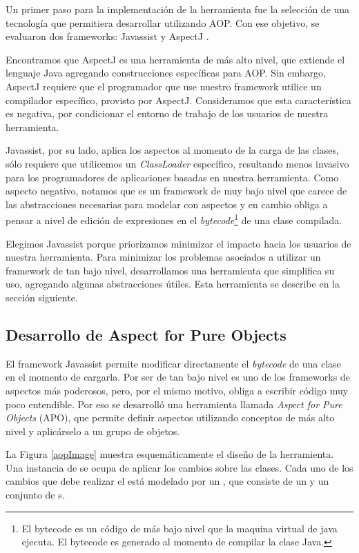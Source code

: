 Un primer paso para la implementación de la herramienta fue la selección de una
tecnología que permitiera desarrollar utilizando AOP.
Con ese objetivo, se evaluaron dos frameworks: Javassist y AspectJ \cite{KiczalesHHKPG01}.

\medskip 
Encontramos que AspectJ es una herramienta de más alto nivel, que extiende
el lenguaje Java agregando construcciones específicas para AOP.
Sin embargo, AspectJ requiere que el programador que use nuestro framework
utilice un compilador específico, provisto por AspectJ. 
Consideramos que esta característica es negativa, por condicionar el
entorno de trabajo de los usuarios de nuestra herramienta.

Javassist, por su lado, aplica los aspectos al momento de
la carga de las clases, sólo requiere que utilicemos un \emph{ClassLoader}
específico, resultando menos invasivo para los programadores de aplicaciones
basadas en nuestra herramienta.
Como aspecto negativo, notamos que es un framework de muy bajo nivel que
carece de las abstracciones necesarias para modelar con aspectos y en cambio
obliga a pensar a nivel de edición de expresiones en el \emph{bytecode}\footnote{
El bytecode es un código de más bajo nivel que la maquina virtual de java ejecuta. El bytecode es generado al
momento de compilar la clase Java.} 
	de una clase compilada.
	
	Elegimos Javassist porque priorizamos minimizar el impacto hacia los usuarios
	de nuestra herramienta.
	Para minimizar los problemas asociados a utilizar un framework de tan bajo
	nivel, desarrollamos una herramienta que simplifica su uso, agregando algunas
	abstracciones útiles. Esta herramienta se describe en la sección siguiente.

\subsection{Desarrollo de Aspect for Pure Objects}
El framework Javassist permite modificar directamente el \emph{bytecode} de
una clase en el momento de cargarla.
Por ser de tan bajo nivel es uno de los frameworks de aspectos más poderosos,
pero, por el mismo motivo, obliga a escribir código muy poco entendible.
Por eso se desarrolló una herramienta llamada \emph{Aspect for Pure Objects} (APO), 
que permite definir aspectos utilizando conceptos de más alto nivel y
aplicárselo a un grupo de objetos. 

La Figura \ref{aopImage} muestra esquemáticamente el diseño de la herramienta.
Una instancia de  se ocupa de aplicar los cambios sobre las
clases.
Cada uno de los cambios que debe realizar el  está
modelado por un , que consiste de un  y un conjunto de 
s.

